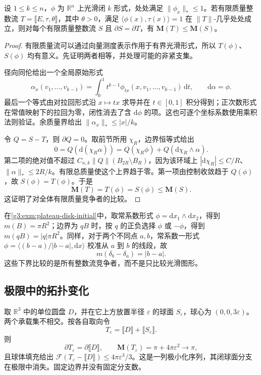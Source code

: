 \begin{proposition}\label{g3:prop:euclidean-current-calibration}
	设 \(1\le k\le n\)，\(\phi\) 为 \(\mathbb R^n\) 上光滑闭 \(k\) 形式，处处满足 \(\|\phi_x\|_*\le1\)。若有限质量整数流
	\(T=\lBrack E,\tau,\theta\rBrack\)，其中 \(\theta>0\)，满足
	\(\langle\phi(x),\tau(x)\rangle=1\) 在 \(\|T\|\)-几乎处处成立，则对每个有限质量整数流 \(S\) 且 \(\partial S=\partial T\)，有 \(\mathbf M(T)\le\mathbf M(S)\)。
\end{proposition}
\begin{proof}
	有限质量流可以通过向量测度表示作用于有界光滑形式，所以 \(T(\phi)\)、\(S(\phi)\) 均有意义。先证明两者相等，并处理可能的非紧支集。

	径向同伦给出一个全局原始形式
	\[
		\alpha_x(v_1,\ldots,v_{k-1})
		=\int_0^1t^{k-1}\phi_{tx}(x,v_1,\ldots,v_{k-1})\,\mathrm dt,
		\qquad \mathrm d\alpha=\phi.
	\]
	最后一个等式由对拉回形式沿 \(x\mapsto tx\) 求导并在 \(t\in[0,1]\) 积分得到；正次数形式在常值映射下的拉回为零，闭性消去了含 \(\mathrm d\phi\) 的项。这也可逐个坐标系数使用乘积法则验证。余质量界给出 \(\|\alpha_x\|_*\le |x|/k\)。

	令 \(Q=S-T\)，则 \(\partial Q=0\)。取前节所用 \(\chi_R\)，边界恒等式给出
	\[
		0=Q(\mathrm d(\chi_R\alpha))
		=Q(\chi_R\phi)+Q(\mathrm d\chi_R\wedge\alpha).
	\]
	第二项的绝对值不超过
	\(C_{n,k}\|Q\|(B_{2R}\setminus B_R)\)，因为该环域上 \(|\mathrm d\chi_R|\le C/R\)、\(\|\alpha\|_*\le2R/k\)。有限总质量使这个上界趋于零。第一项由控制收敛趋于 \(Q(\phi)\)，故 \(S(\phi)=T(\phi)\)。于是
	\[
		\mathbf M(T)=T(\phi)=S(\phi)\le\mathbf M(S).
	\]
	这证明了对全体有限质量竞争者的比较。
\end{proof}

在\cref{g3:exm:plateau-disk-initial}中，取常系数形式
\(\phi=\mathrm dx_1\wedge\mathrm dx_2\)，得到 \(m(B)=\pi R^2\)；边界为 \(qB\) 时，按 \(q\) 的正负选择 \(\phi\) 或 \(-\phi\)，得到 \(m(qB)=|q|\pi R^2\)。同样，对于两个不同点 \(a,b\)，常系数一形式
\(\phi=\langle(b-a)/|b-a|,\mathrm dx\rangle\) 校准从 \(a\) 到 \(b\) 的线段，故
\[
	m(\delta_b-\delta_a)=|b-a|.
\]
这些下界比较的是所有整数流竞争者，而不是只比较光滑图形。

\subsection{极限中的拓扑变化}
\label{g3:subsec:2302:05}
取 \(\mathbb R^3\) 中的单位圆盘 \(D\)，并在它上方放置半径 \(\varepsilon\) 的球面 \(S_\varepsilon\)，球心为 \((0,0,3\varepsilon)\)。两个承载集不相交。按各自取向令
\[
	T_\varepsilon=\lBrack D\rBrack+\lBrack S_\varepsilon\rBrack.
\]
则
\[
	\partial T_\varepsilon=\partial\lBrack D\rBrack,\qquad
	\mathbf M(T_\varepsilon)=\pi+4\pi\varepsilon^2\longrightarrow\pi,
\]
且球体填充给出
\(\mathcal F(T_\varepsilon-\lBrack D\rBrack)\le4\pi\varepsilon^3/3\)。这是一列极小化序列，其闭球面分支在极限中消失。固定边界并没有固定分支数。

